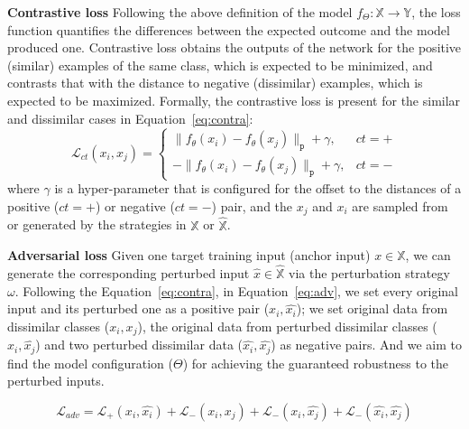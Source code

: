 \textbf{Contrastive loss} Following the above definition of the model $f_{\Theta}: \mathbb{X} \rightarrow \mathbb{Y}$, the loss function quantifies the differences between the expected outcome and the model produced one. Contrastive loss obtains the outputs of the network for the positive (similar) examples of the same class, which is expected to be minimized, and contrasts that with the distance to negative (dissimilar) examples, which is expected to be maximized. Formally, the contrastive loss is present for the similar and dissimilar cases in Equation~\eqref{eq:contra}:
\begin{equation}\label{eq:contra}
    \mathcal{L}_{ct}(x_i,x_j) = \left\{\begin{matrix}
                          \|f_{\theta}(x_i)-f_{\theta}(x_j)\|_{\mathtt{p}} + \gamma,    & ct=+ \\
                          - \|f_{\theta}(x_i)-f_{\theta}(x_j)\|_{\mathtt{p}} + \gamma,  & ct=-
    \end{matrix}\right.
\end{equation}
where $\gamma$ is a hyper-parameter that is configured for the offset to the distances of a positive ($ct=+$) or negative ($ct=-$) pair, and the $x_j$ and $x_i$ are sampled from or generated by the strategies in $\mathbb{X}$ or $\hat{\mathbb{X}}$. 

\textbf{Adversarial loss} Given one target training input (anchor input) $x\in\mathbb{X}$, we can generate the corresponding perturbed input $\hat{x} \in \hat{\mathbb{X}}$ via the perturbation strategy $\omega$. 
Following the Equation~\eqref{eq:contra}, in Equation~\eqref{eq:adv}, we set every original input and its perturbed one as a positive pair ($x_i,\hat{x_i}$); we set original data from dissimilar classes ($x_i,x_j$), the original data from perturbed dissimilar classes ($x_i,\hat{x_j}$) and two perturbed dissimilar data ($\hat{x_i},\hat{x_j}$) as negative pairs. And we aim to find the model configuration ($\Theta$) for achieving the guaranteed robustness to the perturbed inputs.

\begin{equation}\label{eq:adv}
    \mathcal{L}_{adv} = \mathcal{L}_{+}(x_i,\hat{x_i}) + \mathcal{L}_{-}(x_i,x_j) + \mathcal{L}_{-}(x_i,\hat{x_j})  + \mathcal{L}_{-}(\hat{x_i},\hat{x_j}) 
\end{equation}

